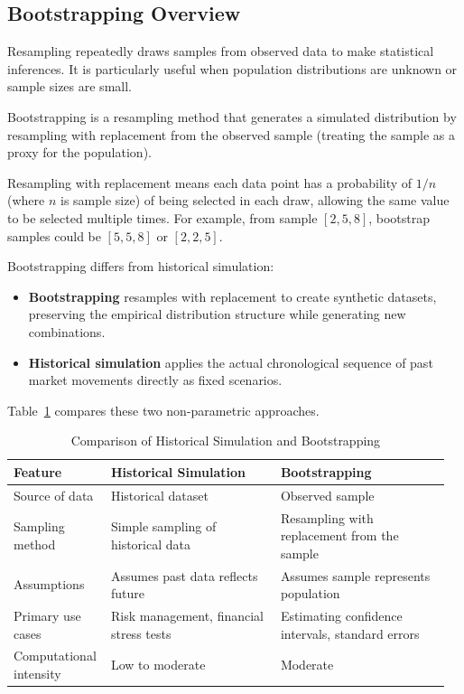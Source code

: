 \subsection{Bootstrapping Overview}
Resampling repeatedly draws samples from observed data to make statistical inferences. It is particularly useful when population distributions are unknown or sample sizes are small.

Bootstrapping is a resampling method that generates a simulated distribution by resampling with replacement from the observed sample (treating the sample as a proxy for the population).

Resampling with replacement means each data point has a probability of $1/n$ (where $n$ is sample size) of being selected in each draw, allowing the same value to be selected multiple times. For example, from sample $[2, 5, 8]$, bootstrap samples could be $[5, 5, 8]$ or $[2, 2, 5]$.

Bootstrapping differs from historical simulation:
\begin{itemize}
	\item \textbf{Bootstrapping} resamples with replacement to create synthetic datasets, preserving the empirical distribution structure while generating new combinations.
	\item \textbf{Historical simulation} applies the actual chronological sequence of past market movements directly as fixed scenarios.
\end{itemize}
Table~\ref{tab:mod9_exhibit_12} compares these two non-parametric approaches.

\begin{table}[!htbp]
\centering
\caption{Comparison of Historical Simulation and Bootstrapping}
\label{tab:mod9_exhibit_12}
\begin{tabular}{p{0.20\linewidth} p{0.38\linewidth} p{0.38\linewidth}}
	\toprule
	\textbf{Feature} & \textbf{Historical Simulation} & \textbf{Bootstrapping} \\
	\midrule
	Source of data & Historical dataset & Observed sample \\
	\midrule
	Sampling method & Simple sampling of historical data & Resampling with replacement from the sample \\
	\midrule
	Assumptions & Assumes past data reflects future & Assumes sample represents population \\
	\midrule
	Primary use cases & Risk management, financial stress tests & Estimating confidence intervals, standard errors \\
	\midrule
	Computational intensity & Low to moderate & Moderate \\
	\bottomrule
\end{tabular}
\end{table}

